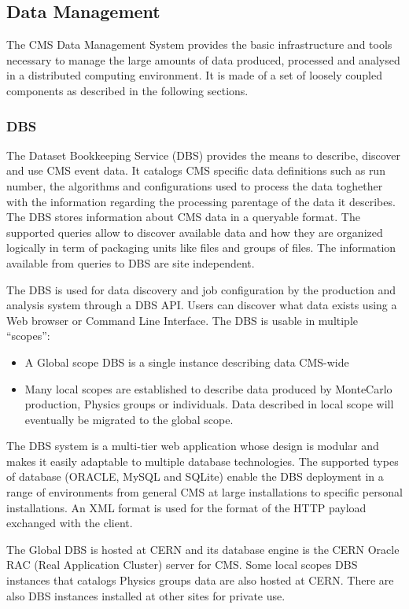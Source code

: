 \subsection{Data Management}
\label{sec:3_1}
The CMS Data Management System provides the basic infrastructure and tools necessary to manage the large amounts of data produced, processed and analysed in a distributed computing environment. It is made of a set of loosely coupled components as described in the following sections.
\subsubsection{DBS}
\label{sec:3_1_1}
The Dataset Bookkeeping Service (DBS)\cite{RefDBS} provides the means to describe, discover and use CMS event data. 
It catalogs CMS specific data definitions such as run number, the algorithms and configurations used to process the data toghether with the information regarding the processing parentage of the data it describes.
The DBS stores information about CMS data in a queryable format. The supported queries allow to discover available data and how they are organized logically in term of packaging units like files and groups of files. The information available from queries to DBS are site independent.

The DBS is used for data discovery and job configuration by the production and analysis system through a DBS API.
Users can discover what data exists using a Web browser or Command Line Interface.
The DBS is usable in multiple “scopes”:
\begin{itemize}
\item A Global scope DBS is a single instance describing data CMS-wide %
\item Many local scopes are established to describe data produced by MonteCarlo production, Physics groups or individuals. Data described in local scope will eventually be migrated to the global scope. 
\end{itemize}
The DBS system is a multi-tier web application whose design is modular and makes it easily adaptable to multiple database technologies. The supported types of database (ORACLE, MySQL and SQLite) enable the DBS deployment in a range of environments from general CMS at large installations to specific personal installations.
An XML format is used for the format of the HTTP payload exchanged with the client.

The Global DBS is hosted at CERN and its database engine is the CERN Oracle RAC (Real Application Cluster) server for CMS. Some local scopes DBS instances that catalogs Physics groups data are also hosted at CERN. There are also DBS instances installed at other sites for private use. 

